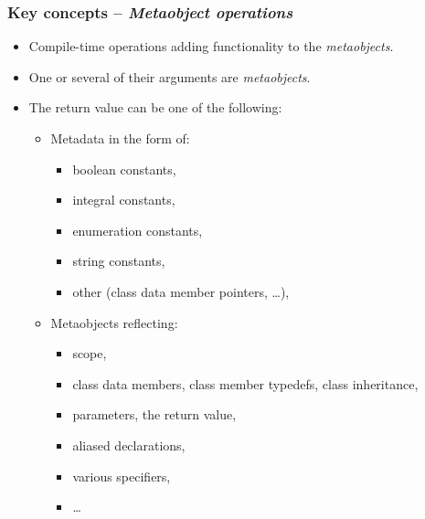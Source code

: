 \documentclass[compress,table,xcolor=table]{beamer}
\begin{document}
\begin{frame}
\frametitle{Key concepts -- {\em Metaobject operations}}
  \begin{itemize}
    \small
    \item Compile-time operations adding functionality to the {\em metaobjects}.
    \item One or several of their arguments are {\em metaobjects}.
    \item The return value can be one of the following:
    \begin{itemize}
      \footnotesize
      \item Metadata in the form of:
      \begin{itemize}
        \item boolean constants,
        \item integral constants,
        \item enumeration constants,
        \item string constants,
        \item other (class data member pointers, \ldots),
      \end{itemize}
      \item Metaobjects reflecting:
      \begin{itemize}
        \item scope,
        \item class data members, class member typedefs, class inheritance,
        \item parameters, the return value,
        \item aliased declarations,
        \item various specifiers,
        \item \ldots
      \end{itemize}
    \end{itemize}
  \end{itemize}
\end{frame}
\end{document}
